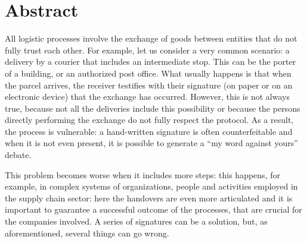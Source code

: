 \chapter*{Abstract} %
\label{abstract}


\iffalse



  Sommario è un breve riassunto del lavoro svolto dove si descrive l'obiettivo, l'oggetto della tesi, le 
metodologie e le tecniche usate, i dati elaborati e la spiegazione delle conclusioni alle quali siete arrivati.  

Il sommario dell’elaborato consiste al massimo di 3 pagine e deve contenere le seguenti informazioni:
\begin{itemize}
  \item contesto e motivazioni 
  \item breve riassunto del problema affrontato
  \item tecniche utilizzate e/o sviluppate
  \item risultati raggiunti, sottolineando il contributo personale del laureando/a
\end{itemize}

\fi

All logistic processes involve the exchange of goods between entities that do not fully trust each other. For example, let us consider a very common scenario: a delivery by a courier that includes an intermediate stop. This can be the porter of a building, or an authorized post office. What usually happens is that when the parcel arrives, the receiver testifies with their signature (on paper or on an electronic device) that the exchange has occurred. However, this is not always true, because not all the deliveries include this possibility or because the persons directly performing the exchange do not fully respect the protocol. As a result, the process is vulnerable: a hand-written signature is often counterfeitable and when it is not even present, it is possible to generate a ``my word against yours'' debate.

This problem becomes worse when it includes more steps: this happens, for example, in complex systems of organizations, people and activities employed in the supply chain sector: here the handovers are even more articulated and it is important to guarantee a successful outcome of the processes, that are crucial for the companies involved. A series of signatures can be a solution, but, as aforementioned, several things can go wrong.

